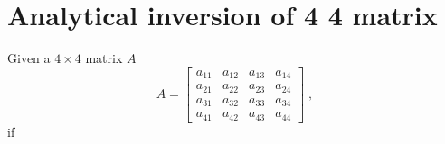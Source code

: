 \documentclass[preprint,12pt]{elsarticle}
\begin{document}
\appendix
\setcounter{figure}{0}
\renewcommand*{\thesection}{\appendixname~\Alph{section}}

\section{Analytical inversion of 4 \texttimes{} 4 matrix}
\label{app:inversion}

Given a $4 \times 4$ matrix $A$
\begin{equation}
    A =
    \begin{bmatrix}
    a_{11}&a_{12}&a_{13}&a_{14} \\
    a_{21}&a_{22}&a_{23}&a_{24} \\
    a_{31}&a_{32}&a_{33}&a_{34} \\
    a_{41}&a_{42}&a_{43}&a_{44}
    \end{bmatrix} \;,
\end{equation}
if
\end{document}
